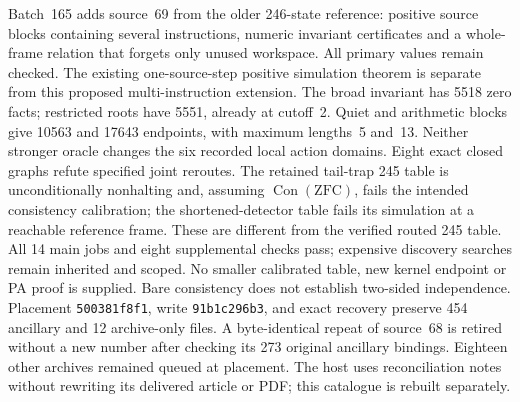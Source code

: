 \documentclass[11pt]{article}
\begin{document}
{Batch~165 adds source~69 from the older 246-state reference: positive source
blocks containing several instructions, numeric invariant certificates and a
whole-frame relation that forgets only unused workspace. All primary values
remain checked. The existing one-source-step positive simulation theorem is
separate from this proposed multi-instruction extension. The broad invariant
has 5518 zero facts; restricted roots have 5551, already at cutoff~2. Quiet and
arithmetic blocks give 10563 and 17643 endpoints, with maximum lengths~5 and~13.
Neither stronger oracle changes the six recorded local action domains.
Eight exact closed graphs refute specified joint reroutes. The retained tail-trap
245 table is unconditionally nonhalting and, assuming $\operatorname{Con}(\mathrm{ZFC})$,
fails the intended consistency calibration; the shortened-detector table fails
its simulation at a reachable reference frame.
These are different from the verified routed 245 table. All 14 main jobs and
eight supplemental checks pass; expensive discovery searches remain inherited
and scoped. No smaller calibrated table, new kernel endpoint or PA proof is
supplied. Bare consistency does not establish two-sided independence.
Placement \texttt{500381f8f1}, write \texttt{91b1c296b3}, and exact recovery preserve
454 ancillary and 12 archive-only files. A byte-identical repeat of source~68
is retired without a new number after checking its 273 original ancillary
bindings. Eighteen other archives remained queued at placement. The host uses reconciliation
notes without rewriting its delivered article or PDF; this catalogue is rebuilt
separately.

}
\end{document}
